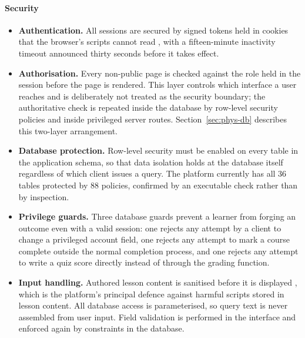 \documentclass[12pt, oneside]{article} %
\begin{document}
\paragraph{Security}
\begin{itemize}
    \item \textbf{Authentication.} All sessions are secured by signed tokens held in cookies that the browser's scripts cannot read \cite{supabase_auth}, with a fifteen-minute inactivity timeout announced thirty seconds before it takes effect.
    \item \textbf{Authorisation.} Every non-public page is checked against the role held in the session before the page is rendered. This layer controls which interface a user reaches and is deliberately not treated as the security boundary; the authoritative check is repeated inside the database by row-level security policies and inside privileged server routes. Section~\ref{sec:phys-db} describes this two-layer arrangement.
    \item \textbf{Database protection.} Row-level security must be enabled on every table in the application schema, so that data isolation holds at the database itself regardless of which client issues a query. The platform currently has all 36 tables protected by 88 policies, confirmed by an executable check rather than by inspection.
    \item \textbf{Privilege guards.} Three database guards prevent a learner from forging an outcome even with a valid session: one rejects any attempt by a client to change a privileged account field, one rejects any attempt to mark a course complete outside the normal completion process, and one rejects any attempt to write a quiz score directly instead of through the grading function.
    \item \textbf{Input handling.} Authored lesson content is sanitised before it is displayed \cite{dompurify}, which is the platform's principal defence against harmful scripts stored in lesson content. All database access is parameterised, so query text is never assembled from user input. Field validation is performed in the interface and enforced again by constraints in the database.
\end{itemize}
\end{document}
